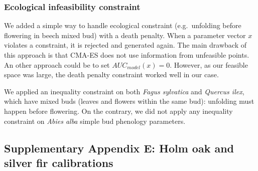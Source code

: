 \subsubsection{Ecological infeasibility
constraint}\label{ecological-infeasibility-constraint}

We added a simple way to handle ecological constraint (e.g.~unfolding
before flowering in beech mixed bud) with a death penalty. When a
parameter vector \(x\) violates a constraint, it is rejected and
generated again. The main drawback of this approach is that CMA-ES does
not use information from unfeasible points. An other approach could be
to set \(AUC_{model}(x)=0\). However, as our feasible space was large,
the death penalty constraint worked well in our case.

We applied an inequality constraint on both \textit{Fagus sylvatica} and
\textit{Quercus ilex}, which have mixed buds (leaves and flowers within
the same bud): unfolding must happen before flowering. On the contrary,
we did not apply any inequality constraint on \textit{Abies alba} simple
bud phenology parameters.

\newpage

\subsection{Supplementary Appendix E: Holm oak and silver fir
calibrations}\label{chap1:appendixE}




